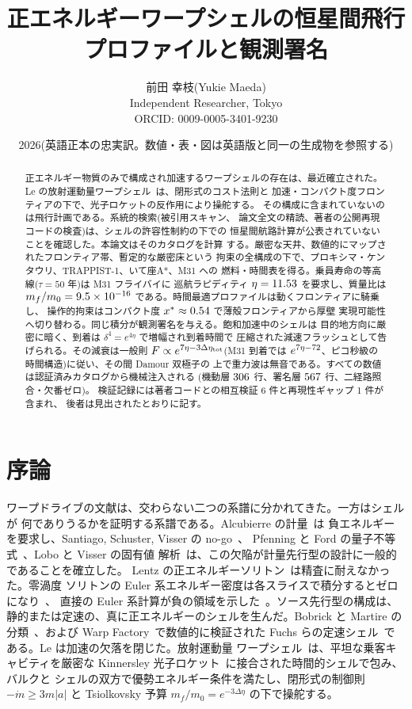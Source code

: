 \documentclass[11pt]{article}
\title{正エネルギーワープシェルの恒星間飛行プロファイルと観測署名}
\author{前田 幸枝(Yukie Maeda)\\ \small Independent Researcher, Tokyo\\
\small ORCID: 0009-0005-3401-9230}
\date{2026(英語正本の忠実訳。数値・表・図は英語版と同一の生成物を参照する)}
\begin{document}
\maketitle

\begin{abstract}
正エネルギー物質のみで構成され加速するワープシェルの存在は、最近確立された。
Le の放射運動量ワープシェル~\cite{le-steering}は、閉形式のコスト法則と
加速・コンパクト度フロンティアの下で、光子ロケットの反作用により操舵する。
その構成に含まれていないのは飛行計画である。系統的検索(被引用スキャン、
論文全文の精読、著者の公開再現コードの検査)は、シェルの許容性制約の下での
恒星間航路計算が公表されていないことを確認した。本論文はそのカタログを計算
する。厳密な天井、数値的にマップされたフロンティア帯、暫定的な厳密床という
拘束の全構成の下で、プロキシマ・ケンタウリ、TRAPPIST-1、いて座A*、M31 への
燃料・時間表を得る。乗員寿命の等高線($\tau = 50$ 年)は M31 フライバイに
巡航ラピディティ $\eta = 11.53$ を要求し、質量比は
$m_f/m_0 = 9.5\times10^{-16}$ である。時間最適プロファイルは動くフロンティアに騎乗し、
操作的拘束はコンパクト度 $x^* \approx 0.54$ で薄殻フロンティアから厚壁
実現可能性へ切り替わる。同じ積分が観測署名を与える。飽和加速中のシェルは
目的地方向に厳密に暗く、到着は $\delta^4 = e^{4\eta}$ で増幅され到着時間で
圧縮された減速フラッシュとして告げられる。その減衰は一般則
$F \propto e^{7\eta - 3\Delta\eta_{\rm tot}}$(M31 到着では
$e^{7\eta-72}$、ピコ秒級の時間構造)に従い、その間 Damour 双極子の
上で重力波は無音である。すべての数値は認証済みカタログから機械注入される
(機動層 $306$ 行、署名層 $567$ 行、二経路照合・欠番ゼロ)。
検証記録には著者コードとの相互検証 6 件と再現性ギャップ 1 件が含まれ、
後者は見出されたとおりに記す。
\end{abstract}

\section{序論}\label{sec:intro}

ワープドライブの文献は、交わらない二つの系譜に分かれてきた。一方はシェルが
何でありうるかを証明する系譜である。Alcubierre の計量~\cite{alcubierre}は
負エネルギーを要求し、Santiago, Schuster, Visser の no-go~\cite{ssv}、
Pfenning と Ford の量子不等式~\cite{pfenning}、Lobo と Visser の固有値
解析~\cite{lobo}は、この欠陥が計量先行型の設計に一般的であることを確立した。
Lentz の正エネルギーソリトン~\cite{lentz}は精査に耐えなかった。零渦度
ソリトンの Euler 系エネルギー密度は各スライスで積分するとゼロになり~\cite{ssv}、
直接の Euler 系計算が負の領域を示した~\cite{celmaster}。ソース先行型の構成は、
静的または定速の、真に正エネルギーのシェルを生んだ。Bobrick と Martire の
分類~\cite{bobrick}、および Warp Factory~\cite{helmerich}で数値的に検証された
Fuchs らの定速シェル~\cite{fuchs}である。Le は加速の欠落を閉じた。放射運動量
ワープシェル~\cite{le-steering}は、平坦な乗客キャビティを厳密な Kinnersley
光子ロケット~\cite{kinnersley}に接合された時間的シェルで包み、バルクと
シェルの双方で優勢エネルギー条件を満たし、閉形式の制御則 $-\dot m \geq
3m|a|$ と Tsiolkovsky 予算 $m_f/m_0 = e^{-3\Delta\eta}$ の下で操舵する。
\end{document}
